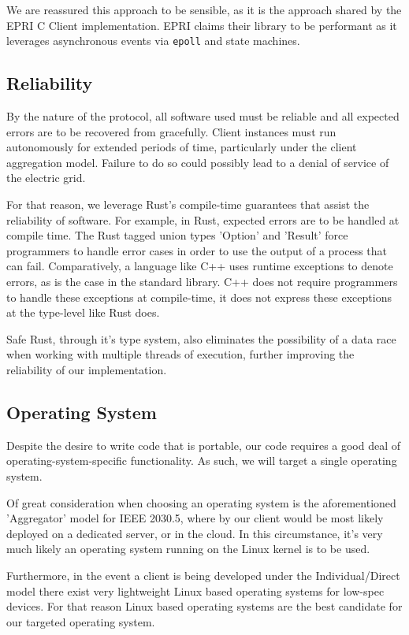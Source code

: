 We are reassured this approach to be sensible, as it is the approach shared by the EPRI C Client implementation. EPRI claims their library to be performant as it leverages asynchronous events via \texttt{epoll} and state machines.


\subsection{Reliability}
By the nature of the protocol, all software used must be reliable and all expected errors are to be recovered from gracefully. Client instances must run autonomously for extended periods of time, particularly under the client aggregation model. Failure to do so could possibly lead to a denial of service of the electric grid.

For that reason, we leverage Rust's compile-time guarantees that assist the reliability of software. For example, in Rust, expected errors are to be handled at compile time. The Rust tagged union types 'Option' and 'Result' force programmers to handle error cases in order to use the output of a process that can fail. Comparatively, a language like C++ uses runtime exceptions to denote errors, as is the case in the standard library. C++ does not require programmers to handle these exceptions at compile-time, it does not express these exceptions at the type-level like Rust does.

Safe Rust, through it's type system, also eliminates the possibility of a data race when working with multiple threads of execution, further improving the reliability of our implementation.

\subsection{Operating System}
Despite the desire to write code that is portable, our code requires a good deal of operating-system-specific functionality. As such, we will target a single operating system. 

Of great consideration when choosing an operating system is the aforementioned 'Aggregator' model for IEEE 2030.5, where by our client would be most likely deployed on a dedicated server, or in the cloud. In this circumstance, it's very much likely an operating system running on the Linux kernel is to be used.

Furthermore, in the event a client is being developed under the Individual/Direct model there exist very lightweight Linux based operating systems for low-spec devices. For that reason Linux based operating systems are the best candidate for our targeted operating system.

